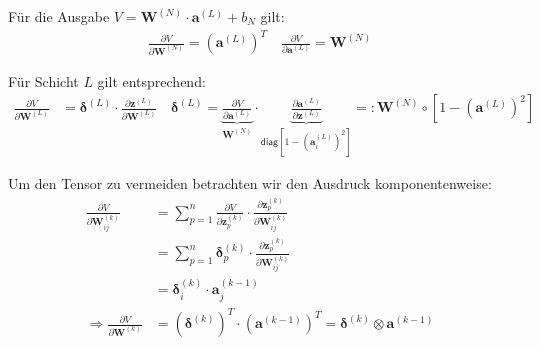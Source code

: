 \documentclass[a4paper, 12pt]{scrartcl}
\begin{document}
\begin{beweis}
    Für die Ausgabe $V = \bm{W}^{(N)} \cdot \bm{a}^{(L)} + b_N$ gilt:
    \begin{align*}
        \frac{\partial V}{\partial \bm{W}^{(N)}} =
        \left(\bm{a}^{(L)}\right)^T
        \quad
        \frac{\partial V}{\partial \bm{a}^{(L)}} 
        = 
        \bm{W}^{(N)} 
    \end{align*}

    Für Schicht $L$ gilt entsprechend:
    \begin{align*}
        \frac{\partial V}{\partial \bm{W}^{(L)}}
        &=
        \bm{\delta}^{(L)}
        \cdot 
        \frac{\partial \bm{z}^{(L)}}{\partial \bm{W}^{(L)}}
        \quad
        \bm{\delta}^{(L)} 
        =
        \underbrace{
            \frac{\partial V}{\partial \bm{a}^{(L)}}
        }_{
            \bm{W}^{(N)} 
        }
        \cdot 
        \underbrace{
            \frac{\partial \bm{a}^{(L)}}{\partial \bm{z}^{(L)}}
        }_{
             \mathsf{diag}\left[1- \left(\bm{a}_i^{(L)}\right)^2 \right]
        }
        =:
        \bm{W}^{(N)}
        \circ
        \left[1- \left(\bm{a}^{(L)}\right)^2 \right]
    \end{align*}

    Um den Tensor zu vermeiden betrachten wir den Ausdruck komponentenweise: 
    \begin{align*}
        \frac{\partial V}{\partial \bm{W}_{ij}^{(k)}}
        &=
        \sum_{p=1}^{n}
        \frac{\partial V}{\partial \bm{z}_p^{(k)}}
        \cdot 
        \frac{\partial \bm{z}_p^{(k)}}{\partial \bm{W}_{ij}^{(k)}}
        \\
        &=
        \sum_{p=1}^{n} \bm{\delta}^{(k)}_p \cdot \frac{\partial \bm{z}_p^{(k)}}{\partial \bm{W}_{ij}^{(k)}}
        \\
        &=
        \bm{\delta}^{(k)}_i \cdot \bm{a}_j^{(k-1)}
        \\
        \Rightarrow
        \frac{\partial V}{\partial \bm{W}^{(k)}} 
        &= 
        \left(\bm{\delta}^{(k)}\right)^T \cdot \left(\bm{a}^{(k-1)}\right)^T 
        = \bm{\delta}^{(k)} \otimes \bm{a}^{(k-1)}
    \end{align*}


\end{beweis}
\end{document}

